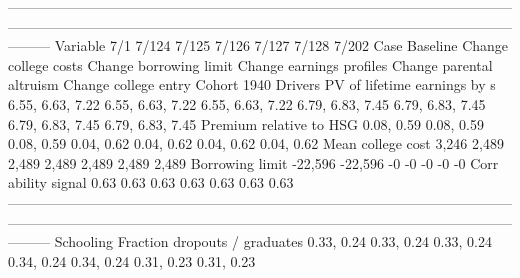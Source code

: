 ---------------------------------------------------------------------------------------------------------------------------------------------------------------------------------------------------------------------------------
                              Variable                          7/1                        7/124                    7/125                     7/126                     7/127                     7/128                     7/202
                                  Case                     Baseline         Change college costs   Change borrowing limit  Change earnings profiles  Change parental altruism      Change college entry               Cohort 1940
                               Drivers                                                                                                                                                                                           
          PV of lifetime earnings by s             6.55, 6.63, 7.22             6.55, 6.63, 7.22         6.55, 6.63, 7.22          6.79, 6.83, 7.45          6.79, 6.83, 7.45          6.79, 6.83, 7.45          6.79, 6.83, 7.45
               Premium relative to HSG                   0.08, 0.59                   0.08, 0.59               0.08, 0.59                0.04, 0.62                0.04, 0.62                0.04, 0.62                0.04, 0.62
                     Mean college cost                        3,246                        2,489                    2,489                     2,489                     2,489                     2,489                     2,489
                       Borrowing limit                      -22,596                      -22,596                       -0                        -0                        -0                        -0                        -0
                   Corr ability signal                         0.63                         0.63                     0.63                      0.63                      0.63                      0.63                      0.63
---------------------------------------------------------------------------------------------------------------------------------------------------------------------------------------------------------------------------------
                             Schooling                                                                                                                                                                                           
         Fraction dropouts / graduates                   0.33, 0.24                   0.33, 0.24               0.33, 0.24                0.34, 0.24                0.34, 0.24                0.31, 0.23                0.31, 0.23

